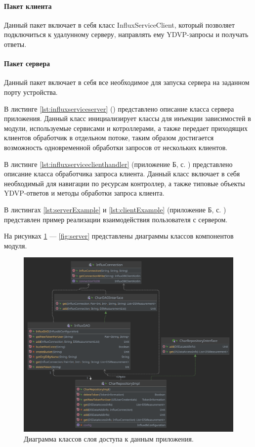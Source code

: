 \paragraph{Пакет клиента \newline}
Данный пакет включает в себя класс InfluxServiceClient, который позволяет подключиться к удалунному серверу, направлять ему YDVP-запросы и получать ответы.

\paragraph{Пакет сервера \newline}

Данный пакет включает в себя все необходимое для запуска сервера на заданном порту устройства.

В листинге \ref{lst:influxserviceserver} () представлено описание класса сервера приложения. Данный класс инициализирует классы для инъекции зависимостей в модули, используемые сервисами и котроллерами, а также передает приходящих клиентов обработчик в отдельном потоке, таким образом достигается возможность одновременной обработки запросов от нескольких клиентов.

В листинге \ref{lst:influxserviceclienthandler} (приложение Б, с. \pageref{chp:application-b}) представлено описание класса обработчика запроса клиента. Данный класс включает в себя необходимый для навигации по ресурсам контроллер, а также типовые объекты YDVP-ответов и методы обработки запроса клиента.

В листингах \ref{lst:serverExample} и \ref{lst:clientExample} (приложение Б, с. \pageref{chp:application-b}) представлен пример реализации взаимодействия пользователя с сервером.

На рисунках \ref{fig:dostup} --- \ref{fig:server} представлены диаграммы классов компонентов модуля.

\begin{figure}[H]
	\centering
	\includegraphics[width=\textwidth]{img/dostup.pdf}
	\caption{Диаграмма классов слоя доступа к данным приложения.}
	\label{fig:dostup}
\end{figure}

